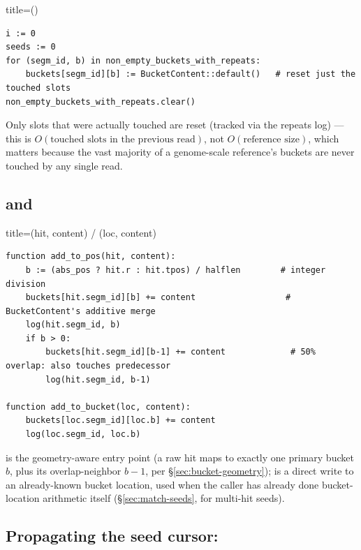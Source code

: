 \begin{algobox}{title={()}}
\begin{verbatim}
i := 0
seeds := 0
for (segm_id, b) in non_empty_buckets_with_repeats:
    buckets[segm_id][b] := BucketContent::default()   # reset just the touched slots
non_empty_buckets_with_repeats.clear()
\end{verbatim}
\end{algobox}

Only slots that were actually touched are reset (tracked via the repeats log) --- this is
$O(\text{touched slots in the previous read})$, not $O(\text{reference size})$, which matters
because the vast majority of a genome-scale reference's buckets are never touched by any single
read.

\subsection{ and }

\begin{algobox}{title={(hit, content) / (loc, content)}}
\begin{verbatim}
function add_to_pos(hit, content):
    b := (abs_pos ? hit.r : hit.tpos) / halflen        # integer division
    buckets[hit.segm_id][b] += content                  # BucketContent's additive merge
    log(hit.segm_id, b)
    if b > 0:
        buckets[hit.segm_id][b-1] += content             # 50% overlap: also touches predecessor
        log(hit.segm_id, b-1)

function add_to_bucket(loc, content):
    buckets[loc.segm_id][loc.b] += content
    log(loc.segm_id, loc.b)
\end{verbatim}
\end{algobox}

 is the geometry-aware entry point (a raw hit maps to exactly one primary
bucket $b$, plus its overlap-neighbor $b{-}1$, per \S\ref{sec:bucket-geometry});  is a direct write to an already-known bucket location, used when the caller has
already done bucket-location arithmetic itself (\S\ref{sec:match-seeds}, for multi-hit seeds).

\subsection{Propagating the seed cursor: }
\label{sec:bucket-propagate}


